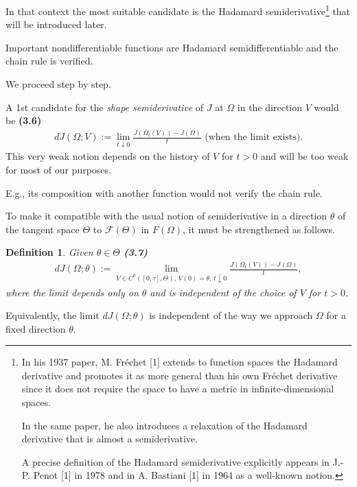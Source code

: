 \documentclass{book}
\numberwithin{equation}{section}
\newtheorem{definition}{Definition}[section]
\begin{document}
\begin{enumerate}
    In that context the most suitable candidate is the Hadamard semiderivative\footnote{In his 1937 paper, M. Fréchet [1] extends to function spaces the Hadamard derivative and promotes it as more general than his own Fréchet derivative since it does not require the space to have a metric in infinite-dimensional spaces.
        
        In the same paper, he also introduces a relaxation of the Hadamard derivative that is almost a semiderivative.
        
        A precise definition of the Hadamard semiderivative explicitly appears in J.-P. Penot [1] in 1978 and in A. Bastiani [1] in 1964 as a well-known notion.} that will be introduced later.
    
    Important nondifferentiable functions are Hadamard semidifferentiable and the chain rule is verified.
    
    We proceed step by step.
    
    A 1st candidate for the \textit{shape semiderivative} of $J$ at $\Omega$ in the direction $V$ would be \textbf{(3.6)}
    \begin{align*}
        dJ(\Omega;V) := \lim_{t\downarrow 0} \frac{J\left(\Omega_t(V)\right) - J(\Omega)}{t} \mbox{ (when the limit exists).}
    \end{align*}
    This very weak notion depends on the history of $V$ for $t > 0$ and will be too weak for most of our purposes.
    
    E.g., its composition with another function would not verify the chain rule.
    
    To make it compatible with the usual notion of semiderivative in a direction $\theta$ of the tangent space $\Theta$ to $\mathcal{F}(\Theta)$ in $F(\Omega)$, it must be strengthened as follows.
    
    \begin{definition}
        Given $\theta\in\Theta$ \textbf{(3.7)}
        \begin{align*}
            dJ(\Omega;\theta) := \lim_{V\in C^0([0,\tau],\Theta),\,V(0) = \theta,\,t\downarrow 0} \frac{J\left(\Omega_t(V)\right) - J(\Omega)}{t},
        \end{align*}
        where the limit depends only on $\theta$ and is independent of the choice of $V$ for $t > 0$.
    \end{definition}
    Equivalently, the limit $dJ(\Omega;\theta)$ is independent of the way we approach $\Omega$ for a fixed direction $\theta$.
    

\end{enumerate}
\end{document}
